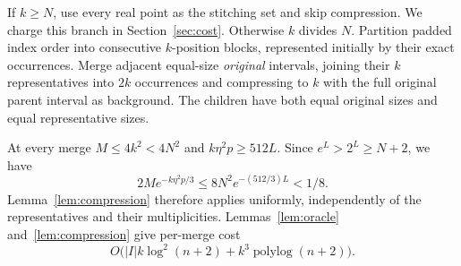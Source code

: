 \documentclass[acmsmall,11pt,nonacm,natbib=false]{acmart}
\newcommand{\polylog}{\operatorname{polylog}}
\begin{document}
If $k\geq N$, use every real point as the stitching set and skip compression.
We charge this branch in Section~\ref{sec:cost}. Otherwise $k$ divides $N$.
Partition padded index order into consecutive $k$-position blocks, represented
initially by their exact occurrences. Merge adjacent equal-size \emph{original}
intervals, joining their $k$ representatives into $2k$ occurrences and
compressing to $k$ with the full original parent interval as background.
The children have both equal original sizes and equal representative sizes.

At every merge $M\leq4k^2<4N^2$ and $k\eta^2p\geq512L$. Since
$e^L>2^L\geq N+2$, we have
\[
 2M e^{-k\eta^2p/3}\leq8N^2e^{-(512/3)L}<1/8.
\]
Lemma~\ref{lem:compression} therefore applies uniformly, independently of
the representatives and their multiplicities. Lemmas~\ref{lem:oracle}
and~\ref{lem:compression} give per-merge cost
\begin{equation}\label{eq:nodecost}
 O\bigl(|I|k\log^2(n+2)+k^3\polylog(n+2)\bigr).
\end{equation}
\end{document}
